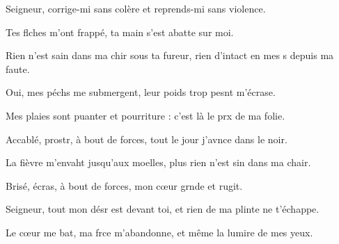 \item Seigneur, corrige-mi sans colère\psstar{} et reprends-mi sans violence.
\item Tes flches m’ont frappé,\psstar{} ta main s’est abatte sur moi.
\item Rien n’est sain dans ma chir sous ta fureur,\psstar{} rien d’intact en mes s depuis ma faute.
\item Oui, mes péchs me submergent,\psstar{} leur poids trop pesnt m’écrase.
\item Mes plaies sont puanter et pourriture :\psstar{} c’est là le prx de ma folie.
\item Accablé, prostr, à bout de forces,\psstar{} tout le jour j’avnce dans le noir.
\item La fièvre m’envaht jusqu’aux moelles,\psstar{} plus rien n’est sin dans ma chair.
\item Brisé, écras, à bout de forces,\psstar{} mon cœur grnde et rugit.
\item Seigneur, tout mon désr est devant toi,\psstar{} et rien de ma plinte ne t’échappe.
\item Le cœur me bat, ma frce m’abandonne,\psstar{} et même la lumire de mes yeux.